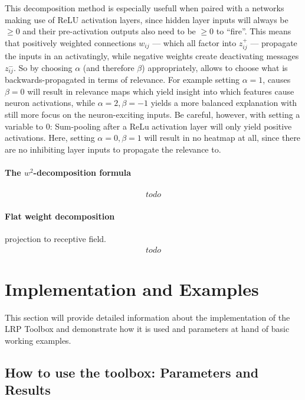 \documentclass[a4wide]{article}
\begin{document}
This decomposition method is especially usefull when paired with a networks making use of ReLU activation layers, since hidden layer inputs will always be $\geq 0$ and their pre-activation outputs also need to be $\geq 0$ to ``fire''. This means that positively weighted connections $w_{ij}$ --- which all factor into $z_{ij}^+$ --- propagate the inputs in an activatingly, while negative weights create deactivating messages $z_{ij}^-$. So by choosing $\alpha$ (and therefore $\beta$) appropriately, allows to choose what is backwards-propagated in terms of relevance. For example setting $\alpha = 1$, causes $\beta = 0$ will result in relevance maps which yield insight into which features cause neuron activations, while $\alpha=2, \beta=-1$ yields a more balanced explanation with still more focus on the neuron-exciting inputs. Be careful, however, with setting a variable to 0: Sum-pooling after a ReLu activation layer will only yield positive activations. Here, setting $\alpha=0,\beta=1$ will result in no heatmap at all, since there are no inhibiting layer inputs to propagate the relevance to.

\paragraph{The $w^2$-decomposition formula}
\begin{align}
todo\label{eq:lrp_ww}
\end{align}

\paragraph{Flat weight decomposition}
projection to receptive field.
\begin{align}
todo\label{eq:lrp_flat}
\end{align}




\section{Implementation and Examples}
\label{sec:implementation}
This section will provide detailed information about the implementation of the LRP Toolbox and demonstrate how it is used and parameters at hand of basic working examples.

\subsection*{How to use the toolbox: Parameters and Results}
\end{document}
